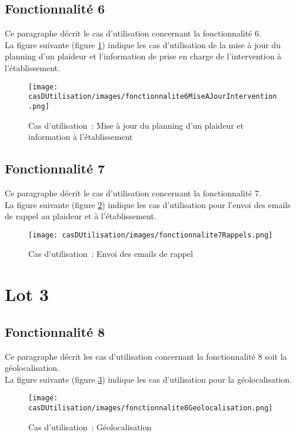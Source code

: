 \subsection{Fonctionnalité 6}
Ce paragraphe décrit le cas d'utilisation concernant la fonctionnalité 6. \\

La figure suivante (figure \ref{diagrammeCasUtilisation6}) indique les cas d'utilisation de la mise à jour du planning d'un plaideur et l'information de prise en charge de l'intervention à l'établissement.
\begin{figure}[H]
	\centering
	\texttt{[image: casDUtilisation/images/fonctionnalite6MiseAJourIntervention.png]}
	\caption{Cas d'utilisation~: Mise à jour du planning d'un plaideur et information à l'établissement}
	\label{diagrammeCasUtilisation6}
\end{figure}

\subsection{Fonctionnalité 7}
Ce paragraphe décrit le cas d'utilisation concernant la fonctionnalité 7.\\

La figure suivante (figure \ref{diagrammeCasUtilisation7}) indique les cas d'utilisation pour l'envoi des emails de rappel au plaideur et à l'établissement.
\begin{figure}[H]
	\centering
	\texttt{[image: casDUtilisation/images/fonctionnalite7Rappels.png]}
	\caption{Cas d'utilisation~: Envoi des emails de rappel}
	\label{diagrammeCasUtilisation7}
\end{figure}

\section{Lot 3}
\subsection{Fonctionnalité 8}
Ce paragraphe décrit les cas d'utilisation concernant la fonctionnalité 8 soit la géolocalisation. \\

La figure suivante (figure \ref{diagrammeCasUtilisation8}) indique les cas d'utilisation pour la géolocalisation.
\begin{figure}[H]
	\centering
	\texttt{[image: casDUtilisation/images/fonctionnalite8Geolocalisation.png]}
	\caption{Cas d'utilisation~: Géolocalisation }
	\label{diagrammeCasUtilisation8}
\end{figure}

